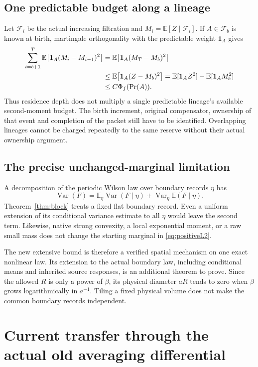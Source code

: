 \documentclass[11pt,letterpaper]{article}
\numberwithin{equation}{section}
\theoremstyle{definition}\newtheorem{definition}[theorem]{Definition}
\theoremstyle{remark}\newtheorem{remark}[theorem]{Remark}
\newcommand{\E}{\mathbb E}\newcommand{\Var}{\operatorname{Var}}
\begin{document}
\subsection{One predictable budget along a lineage}

Let $\mathcal F_i$ be the actual increasing filtration and $M_i=\E[Z\mid\mathcal F_i]$. If $A\in\mathcal F_b$ is known at birth, martingale orthogonality with the predictable weight $\mathbf1_A$ gives
\begin{align}
 \sum_{i=b+1}^{T}\E\bigl[\mathbf1_A(M_i-M_{i-1})^2\bigr]
 &=\E\bigl[\mathbf1_A(M_T-M_b)^2\bigr]\notag\\
 &\le\E\bigl[\mathbf1_A(Z-M_b)^2\bigr]
 =\E[\mathbf1_AZ^2]-\E[\mathbf1_AM_b^2]\notag\\
 &\le C\Phi_f(\Pr(A)).
 \label{eq:lineage}
\end{align}
Thus residence depth does not multiply a single predictable lineage's available second-moment budget. The birth increment, original compensator, ownership of that event and completion of the packet still have to be identified. Overlapping lineages cannot be charged repeatedly to the same reserve without their actual ownership argument.

\subsection{The precise unchanged-marginal limitation}

A decomposition of the periodic Wilson law over boundary records $\eta$ has
\[
 \Var(F)=\E_\eta\Var(F\mid\eta)+\Var_\eta\E(F\mid\eta).
\]
Theorem~\ref{thm:block} treats a fixed flat boundary record. Even a uniform extension of its conditional variance estimate to all $\eta$ would leave the second term. Likewise, native strong convexity, a local exponential moment, or a raw small mass does not change the starting marginal in \eqref{eq:positiveL2}.

The new extensive bound is therefore a verified spatial mechanism on one exact nonlinear law. Its extension to the actual boundary law, including conditional means and inherited source responses, is an additional theorem to prove. Since the allowed $R$ is only a power of $\beta$, its physical diameter $aR$ tends to zero when $\beta$ grows logarithmically in $a^{-1}$. Tiling a fixed physical volume does not make the common boundary records independent.

\section{Current transfer through the actual old averaging differential}
\label{sec:hodge}
\end{document}
